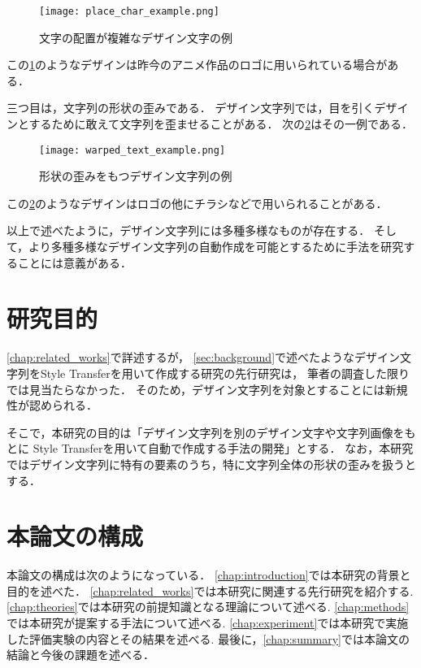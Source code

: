 \documentclass[\homedir/main.tex]{subfiles}
\begin{document}
\begin{figure}[h]
    \centering
    \texttt{[image: place\_char\_example.png]}
    \caption{文字の配置が複雑なデザイン文字の例}
    \label{fig:X}
\end{figure}

この\cref{fig:X}のようなデザインは昨今のアニメ作品のロゴに用いられている場合がある．

三つ目は，文字列の形状の歪みである．
デザイン文字列では，目を引くデザインとするために敢えて文字列を歪ませることがある．
次の\cref{fig:warp_txt_eg}はその一例である．

\begin{figure}[h]
    \centering
    \texttt{[image: warped\_text\_example.png]}
    \caption{形状の歪みをもつデザイン文字列の例}
    \label{fig:warp_txt_eg}
\end{figure}

この\cref{fig:warp_txt_eg}のようなデザインはロゴの他にチラシなどで用いられることがある．

以上で述べたように，デザイン文字列には多種多様なものが存在する．
そして，より多種多様なデザイン文字列の自動作成を可能とするために手法を研究することには意義がある．

\section{研究目的}\label{sec:objective}
\cref{chap:related_works}で詳述するが，
\cref{sec:background}で述べたようなデザイン文字列をStyle Transferを用いて作成する研究の先行研究は，
筆者の調査した限りでは見当たらなかった．
そのため，デザイン文字列を対象とすることには新規性が認められる．

そこで，本研究の目的は「デザイン文字列を別のデザイン文字や文字列画像をもとに
Style Transferを用いて自動で作成する手法の開発」とする．
なお，本研究ではデザイン文字列に特有の要素のうち，特に文字列全体の形状の歪みを扱うとする．

\section{本論文の構成}\label{sec:structure}
本論文の構成は次のようになっている．
\cref{chap:introduction}では本研究の背景と目的を述べた．
\cref{chap:related_works}では本研究に関連する先行研究を紹介する.
\cref{chap:theories}では本研究の前提知識となる理論について述べる.
\cref{chap:methods}では本研究が提案する手法について述べる.
\cref{chap:experiment}では本研究で実施した評価実験の内容とその結果を述べる.
最後に，\cref{chap:summary}では本論文の結論と今後の課題を述べる．

\printBibForSubfiles
\end{document}

